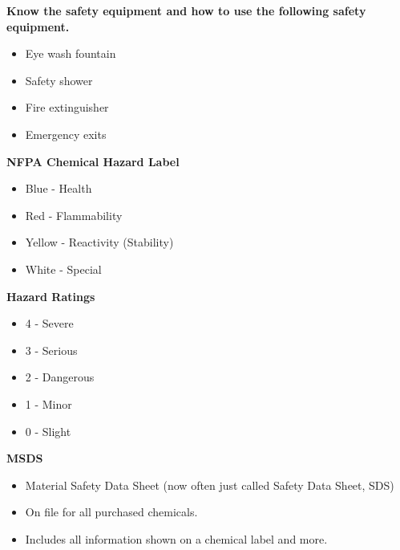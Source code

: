 \documentclass[../hchem.tex]{subfiles}
\begin{document}
\textbf{Know the safety equipment and how to use the following safety equipment.}
\begin{itemize}
    \item Eye wash fountain 
    \item Safety shower
    \item Fire extinguisher
    \item Emergency exits 
\end{itemize}

\textbf{NFPA Chemical Hazard Label} 
\begin{itemize}
    \item Blue - Health 
    \item Red - Flammability
    \item Yellow - Reactivity (Stability)
    \item White - Special 
\end{itemize}

\textbf{Hazard Ratings}
\begin{itemize}
    \item 4 - Severe 
    \item 3 - Serious 
    \item 2 - Dangerous 
    \item 1 - Minor 
    \item 0 - Slight 
\end{itemize}

\textbf{MSDS} 
\begin{itemize}
    \item Material Safety Data Sheet (now often just called Safety Data Sheet, SDS)
    \item On file for all purchased chemicals.
    \item Includes all information shown on a chemical label and more.
\end{itemize}
\end{document}
